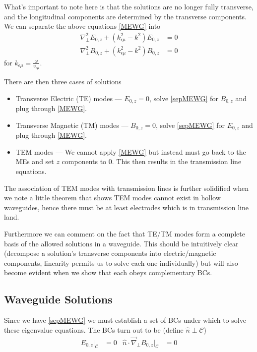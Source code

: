 \documentclass[10pt,twocolumn]{article}
\begin{document}
What's important to note here is that the solutions are no longer fully transverse, and the longitudinal components are determined by the transverse components. We can separate the above equations \eqref{MEWG} into
\begin{align}
    \nabla^2_{\perp}E_{0,z} + \left( k_{\epsilon \mu}^2 - k^2 \right)E_{0,z} &= 0 \\
    \nabla^2_{\perp}B_{0,z} + \left( k_{\epsilon \mu}^2 - k^2 \right)B_{0,z} &= 0\label{sepMEWG}
\end{align}
for $k_{\epsilon \mu} = \frac{\omega}{v_{\epsilon \mu}}$. 

There are then three cases of solutions
\begin{itemize}
    \item Transverse Electric (TE) modes --- $E_{0,z} = 0$, solve \eqref{sepMEWG} for $B_{0,z}$ and plug through \eqref{MEWG}.
    \item Transverse Magnetic (TM) modes --- $B_{0,z} = 0$, solve \eqref{sepMEWG} for $E_{0,z}$ and plug through \eqref{MEWG}.
    \item TEM modes --- We cannot apply \eqref{MEWG} but instead must go back to the MEs and set $z$ components to $0$. This then results in the transmission line equations.
\end{itemize}

The association of TEM modes with transmission lines is further solidified when we note a little theorem that shows TEM modes cannot exist in hollow waveguides, hence there must be at least electrodes which is in transmission line land.

Furthermore we can comment on the fact that TE/TM modes form a complete basis of the allowed solutions in a waveguide. This should be intuitively clear (decompose a solution's transverse components into electric/magnetic components, linearity permits us to solve each one individually) but will also become evident when we show that each obeys complementary BCs.

\subsection{Waveguide Solutions}

Since we have \eqref{sepMEWG} we must establish a set of BCs under which to solve these eigenvalue equations. The BCs turn out to be (define $\hat{n} \perp \mathcal{C}$)
\begin{align}
    E_{0,z}\Big|_\mathcal{C} &= 0 & \hat{n} \cdot \vec{\nabla}_{\perp}B_{0,z}\Big|_{\mathcal{C}} &= 0
\end{align}
\end{document}
